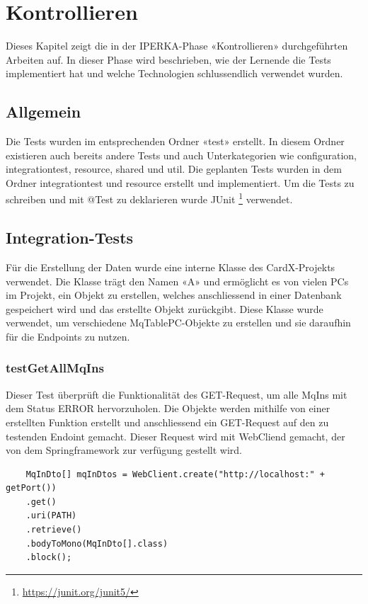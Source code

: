 \chapter{Kontrollieren}\label{ch:kontrollieren}
Dieses Kapitel zeigt die in der IPERKA-Phase «Kontrollieren» durchgeführten Arbeiten auf. In dieser Phase wird beschrieben, wie der Lernende die Tests implementiert hat und welche Technologien schlussendlich verwendet wurden.

\section{Allgemein}
Die Tests wurden im entsprechenden Ordner «test» erstellt. In diesem Ordner existieren auch bereits andere Tests und auch Unterkategorien wie configuration, integrationtest, resource, shared und util. Die geplanten Tests wurden in dem Ordner integrationtest und resource erstellt und implementiert. Um die Tests zu schreiben und mit @Test zu deklarieren wurde JUnit \footnote{\url{https://junit.org/junit5/}} verwendet.

\section{Integration-Tests}
Für die Erstellung der Daten wurde eine interne Klasse des CardX-Projekts verwendet. Die Klasse trägt den Namen «A» und ermöglicht es von vielen PCs im Projekt, ein Objekt zu erstellen, welches anschliessend in einer Datenbank gespeichert wird und das erstellte Objekt zurückgibt. Diese Klasse wurde verwendet, um verschiedene MqTablePC-Objekte zu erstellen und sie daraufhin für die Endpoints zu nutzen.

\subsection{testGetAllMqIns}
Dieser Test überprüft die Funktionalität des GET-Request, um alle MqIns mit dem Status ERROR hervorzuholen. Die Objekte werden mithilfe von einer erstellten Funktion erstellt und anschliessend ein GET-Request auf den zu testenden Endoint gemacht. Dieser Request wird mit WebCliend gemacht, der von dem Springframework zur verfügung gestellt wird.

\begin{verbatim}
	MqInDto[] mqInDtos = WebClient.create("http://localhost:" + getPort())
	.get()
	.uri(PATH)
	.retrieve()
	.bodyToMono(MqInDto[].class)
	.block();
\end{verbatim}

